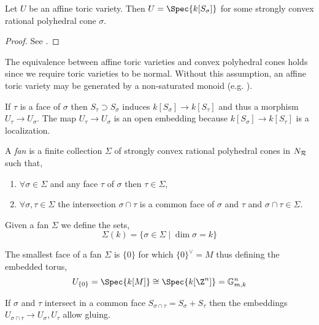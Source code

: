 \begin{theorem}
Let $U$ be an affine toric variety. Then $U = \Spec{k[S_\sigma]}$ for some strongly convex rational polyhedral cone $\sigma$.
\end{theorem}

\begin{proof}
See \cite[Thm. 1.3.5]{cox}.
\end{proof}

\begin{rmk}
The equivalence between affine toric varieties and convex polyhedral cones holds since we require toric varieties to be normal. Without this assumption, an affine toric variety may be generated by a non-saturated monoid (e.g. \cite[Ex. 1.10]{cox_lectures}).
\end{rmk}

\begin{remark}
If $\tau$ is a face of $\sigma$ then $S_\tau \supset S_\sigma$ induces $k[S_\sigma] \to k[S_\tau]$ and thus a morphism $U_\tau \to U_\sigma$. The map $U_\tau \to U_\sigma$ is an open embedding because $k[S_\sigma] \to k[S_\tau]$ is a localization. 
\end{remark}

\begin{definition}
A \textit{fan} is a finite collection $\Sigma$ of strongly convex rational polyhedral cones in $N_{\mathcal{R}}$ such that,
\begin{enumerate}
\item $\forall \sigma \in \Sigma$ and any face $\tau$ of $\sigma$ then $\tau \in \Sigma$,
\item $\forall \sigma, \tau \in \Sigma$ the intersection $\sigma \cap \tau$ is a common face of $\sigma$ and $\tau$ and $\sigma \cap \tau \in \Sigma$.
\end{enumerate}
Given a fan $\Sigma$ we define the sets,
\[ \Sigma(k) = \{ \sigma \in \Sigma \mid \dim{\sigma} = k \} \]
\end{definition}

\begin{remark}
The smallest face of a fan $\Sigma$ is $\{ 0 \}$ for which $\{ 0 \}^\vee = M$ thus defining the embedded torus,
\[ U_{\{0\}} = \Spec{k[M]} \cong \Spec{k[\Z^n]} = \mathbb{G}_{m,k}^n \]
\end{remark}

\begin{remark}
If $\sigma$ and $\tau$ intersect in a common face $S_{\sigma \cap \tau} = S_\sigma + S_\tau$ then the embeddings $U_{\sigma \cap \tau} \to U_{\sigma}, U_{\tau}$ allow gluing. 
\end{remark}


